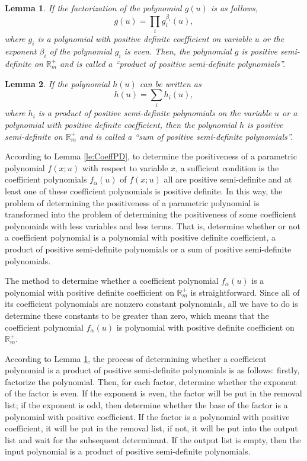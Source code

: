 \documentclass[10pt,a4paper]{article}
\newtheorem{Lemma}{Lemma}
\begin{document}
\begin{Lemma}\label{le:SemiPDProd}
  If the factorization of the polynomial $g(u)$ is as follows,
  \begin{equation*}
    g(u) = \prod_{i} g_i^{\beta_i}(u),
  \end{equation*}
  where $g_i$ is a polynomial with positive definite coefficient on variable $u$ or the exponent $\beta_i$ of the polynomial $g_i$ is even. Then, the polynomial $g$ is positive semi-definite on $\mathbb{R}_m^+$ and is called a ``product of positive semi-definite polynomials''.
\end{Lemma}

\begin{Lemma}\label{le:SemiPDSum}
  If the polynomial $h(u)$ can be written as
  \begin{equation*}
    h(u) =  \sum_{i} h_i(u),
  \end{equation*}
  where $h_i$ is a product of positive semi-definite polynomials on the variable $u$ or a polynomial with positive definite coefficient, then the polynomial $h$ is positive semi-definite on $\mathbb{R}_m^+$ and is called a ``sum of positive semi-definite polynomials''.
\end{Lemma}

According to Lemma \ref{le:CoeffPD}, to determine the positiveness of a parametric polynomial $f(x;u)$ with respect to variable $x$, a sufficient condition is the coefficient polynomials $f_{\alpha}(u)$ of $f(x;u)$ all are positive semi-definite and at least one of these coefficient polynomials is positive definite. In this way, the problem of determining the positiveness of a parametric polynomial is transformed into the problem of determining the positiveness of some coefficient polynomials with less variables and less terms. That is,  determine whether or not a coefficient polynomial is a polynomial with positive definite coefficient, a product of positive semi-definite polynomials or a sum of positive semi-definite polynomials.

The method to determine whether a coefficient polynomial $f_{\alpha}(u)$ is a polynomial with positive definite coefficient on $\mathbb{R}_m^+$ is straightforward. Since all of its coefficient polynomials are nonzero constant polynomials, all we have to do is determine these constants to be greater than zero, which means that the coefficient polynomial $f_{\alpha}(u)$ is polynomial with positive definite coefficient on $\mathbb{R}_m^+$.

According to Lemma \ref{le:SemiPDProd}, the process of determining whether a coefficient polynomial is a product of positive semi-definite polynomials is as follows: firstly, factorize the polynomial. Then, for each factor, determine whether the exponent of the factor is even. If the exponent is even, the factor will be put in the removal list; if the exponent is odd, then determine whether the base of the factor is a polynomial with positive coefficient. If the factor is a polynomial with positive coefficient, it will be put in the removal list, if not, it will be put into the output list and wait for the subsequent determinant. If the output list is empty, then the input polynomial is a product of positive semi-definite polynomials.
\end{document}
